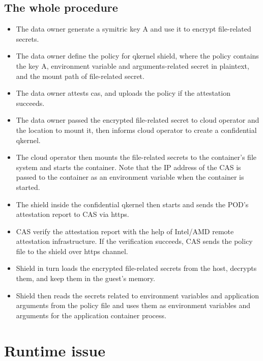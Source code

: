 \subsection{The whole procedure}
\begin{itemize}
    \item   The data owner generate a symitric key A and use it to encrypt file-related secrets.
    \item  The data owner define the policy for qkernel shield, where the policy contains the key A, environment variable and arguments-related secret in plaintext, and the mount path of file-related secret.
    \item  The data owner attests cas, and uploads the policy if the attestation succeeds.
    \item  The data owner passed the encrypted file-related secret to cloud operator and the location to mount it, then informs cloud operator to create a confidential qkernel.
    \item  The cloud operator then mounts the file-related secrets to the container's file system and starts the container. Note that the IP address of the CAS is passed to the container as an environment variable when the container is started.
    \item  The shield inside the confidential qkernel then starts and sends the POD's attestation report to CAS via https.
    \item  CAS verify the attestation report with the help of Intel/AMD remote attestation infrastructure. If the verification succeeds, CAS sends the policy file to the shield over https channel.
    \item  Shield in turn loads the encrypted file-related secrets from the host, decrypts them, and keep them in the guest's memory. 
    \item  Shield then reads the secrets related to environment variables and application arguments from the policy file and uses them as environment variables and  arguments for the application container process.
\end{itemize}


\section{Runtime issue}
